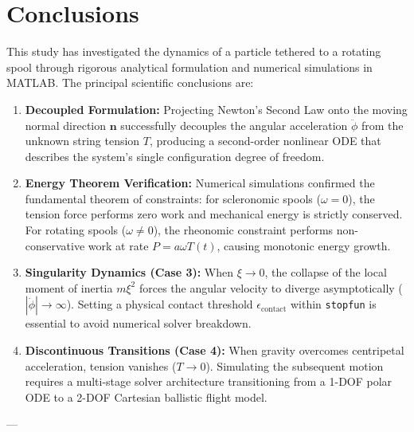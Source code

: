 \documentclass[11pt,a4paper]{article}
\begin{document}
\section{Conclusions}
\label{sec:conclusions}

This study has investigated the dynamics of a particle tethered to a rotating spool through rigorous analytical formulation and numerical simulations in MATLAB. The principal scientific conclusions are:
\begin{enumerate}
    \item \textbf{Decoupled Formulation:} Projecting Newton's Second Law onto the moving normal direction $\mathbf{n}$ successfully decouples the angular acceleration $\ddot{\phi}$ from the unknown string tension $T$, producing a second-order nonlinear ODE that describes the system's single configuration degree of freedom.
    \item \textbf{Energy Theorem Verification:} Numerical simulations confirmed the fundamental theorem of constraints: for scleronomic spools ($\omega = 0$), the tension force performs zero work and mechanical energy is strictly conserved. For rotating spools ($\omega \neq 0$), the rheonomic constraint performs non-conservative work at rate $P = a\omega T(t)$, causing monotonic energy growth.
    \item \textbf{Singularity Dynamics (Case 3):} When $\xi \to 0$, the collapse of the local moment of inertia $m\xi^2$ forces the angular velocity to diverge asymptotically ($|\dot{\phi}| \to \infty$). Setting a physical contact threshold $\epsilon_{\text{contact}}$ within \texttt{stopfun} is essential to avoid numerical solver breakdown.
    \item \textbf{Discontinuous Transitions (Case 4):} When gravity overcomes centripetal acceleration, tension vanishes ($T \to 0$). Simulating the subsequent motion requires a multi-stage solver architecture transitioning from a 1-DOF polar ODE to a 2-DOF Cartesian ballistic flight model.
\end{enumerate}

---



\end{document}
